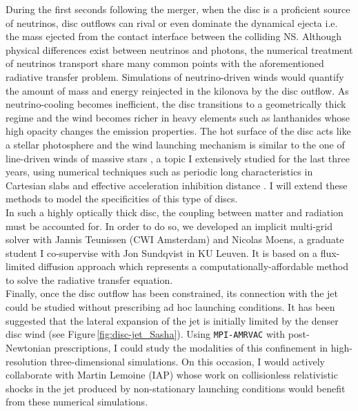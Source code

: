 \documentclass[11pt,onecolumn]{article}
\makeatletter
\newcommand*{\ns}{NS\@\xspace}
\newcommand*{\ie}{i.e.\@\xspace}
\makeatother
\begin{document}
During the first seconds following the merger, when the disc is a proficient source of neutrinos, disc outflows can rival or even dominate the dynamical ejecta \ie the mass ejected from the contact interface between the colliding \ns. Although physical differences exist between neutrinos and photons, the numerical treatment of neutrinos transport share many common points with the aforementioned radiative transfer problem. Simulations of neutrino-driven winds would quantify the amount of mass and energy reinjected in the kilonova by the disc outflow. As neutrino-cooling becomes inefficient, the disc transitions to a geometrically thick regime and the wind becomes richer in heavy elements such as lanthanides whose high opacity changes the emission properties. The hot surface of the disc acts like a stellar photosphere and the wind launching mechanism is similar to the one of line-driven winds of massive stars \citep{Castor1975}, a topic I extensively studied for the last three years, using numerical techniques such as periodic long characteristics in Cartesian slabs and effective acceleration inhibition distance \citep{ElMellah2018}. I will extend these methods to model the specificities of this type of discs.\\

In such a highly optically thick disc, the coupling between matter and radiation must be accounted for. In order to do so, we developed an implicit multi-grid solver with Jannis Teunissen (CWI Amsterdam) and Nicolas Moens, a graduate student I co-supervise with Jon Sundqvist in KU Leuven. It is based on a flux-limited diffusion approach which represents a computationally-affordable method to solve the radiative transfer equation.\\

Finally, once the disc outflow has been constrained, its connection with the jet could be studied without prescribing ad hoc launching conditions. It has been suggested that the lateral expansion of the jet is initially limited by the denser disc wind (see Figure\,\ref{fig:disc-jet_Sasha}). Using \texttt{MPI-AMRVAC} with post-Newtonian prescriptions, I could study the modalities of this confinement in high-resolution three-dimensional simulations. On this occasion, I would actively collaborate with Martin Lemoine (IAP) whose work on collisionless relativistic shocks in the jet produced by non-stationary launching conditions \citep{Pelletier2017} would benefit from these numerical simulations. \\
\end{document}
